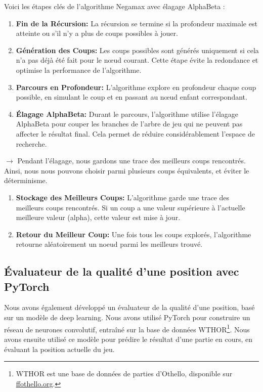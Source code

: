 Voici les étapes clés de l'algorithme Negamax avec élagage AlphaBeta :

\begin{enumerate}[label=\textbf{Étape \arabic*:}, wide, labelwidth=!, labelindent=0pt]
    \item \textbf{Fin de la Récursion:} La récursion se termine si la profondeur maximale est atteinte ou s'il n'y a plus de coups possibles à jouer.

    \item \textbf{Génération des Coups:} Les coups possibles sont générés uniquement si cela n'a pas déjà été fait pour le nœud courant. Cette étape évite la redondance et optimise la performance de l'algorithme.

    \item \textbf{Parcours en Profondeur:} L'algorithme explore en profondeur chaque coup possible, en simulant le coup et en passant au nœud enfant correspondant.

    \item \textbf{Élagage AlphaBeta:} Durant le parcours, l'algorithme utilise l'élagage AlphaBeta pour couper les branches de l'arbre de jeu qui ne peuvent pas affecter le résultat final. Cela permet de réduire considérablement l'espace de recherche.
\end{enumerate}
$\rightarrow$  Pendant l'élagage, nous gardons une trace des meilleurs coups rencontrés. Ainsi, nous nous pouvons choisir parmi plusieurs coups équivalents, et éviter le déterminisme.

\begin{enumerate}[resume, label=\textbf{Étape \arabic*:}, wide, labelwidth=!, labelindent=0pt]
    \item \textbf{Stockage des Meilleurs Coups:} L'algorithme garde une trace des meilleurs coups rencontrés. Si un coup a une valeur supérieure à l'actuelle meilleure valeur (alpha), cette valeur est mise à jour.

    \item \textbf{Retour du Meilleur Coup:} Une fois tous les coups explorés, l'algorithme retourne aléatoirement un noeud parmi les meilleurs trouvé.
\end{enumerate}


\subsection{Évaluateur de la qualité d'une position avec PyTorch}
\label{subsec:eval}
Nous avons également développé un évaluateur de la qualité d'une position, basé sur un modèle de deep learning. Nous avons utilisé PyTorch pour construire un réseau de neurones convolutif, entraîné sur la base de données WTHOR\footnote{WTHOR est une base de données de parties d'Othello, disponible sur \href{http://www.ffothello.org/informatique/la-base-wthor/}{ffothello.org}.}. Nous avons ensuite utilisé ce modèle pour prédire le résultat d'une partie en cours, en évaluant la position actuelle du jeu.

